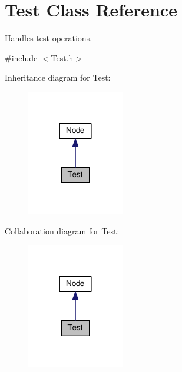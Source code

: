 \hypertarget{classTest}{}\section{Test Class Reference}
\label{classTest}


Handles test operations.  




{\ttfamily \#include $<$Test.\+h$>$}



Inheritance diagram for Test\+:
\nopagebreak
\begin{figure}[H]
\begin{center}
\leavevmode
\includegraphics[width=120pt]{classTest__inherit__graph}
\end{center}
\end{figure}


Collaboration diagram for Test\+:
\nopagebreak
\begin{figure}[H]
\begin{center}
\leavevmode
\includegraphics[width=120pt]{classTest__coll__graph}
\end{center}
\end{figure}
